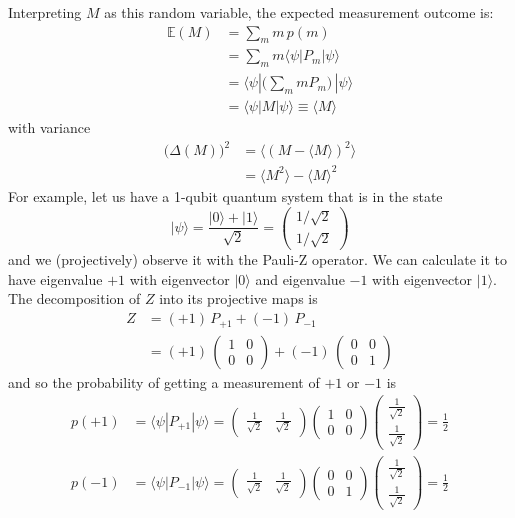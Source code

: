 \documentclass{article}
\theoremstyle{definition}
\begin{document}
Interpreting $M$ as this random variable, the expected measurement outcome is:
\begin{align*}
  \mathbb{E}(M) & = \sum_m m\, p(m) \\
  & = \sum_m m \langle \psi | P_m | \psi \rangle \\
  & = \langle \psi | \bigg( \sum_m m P_m \bigg) \, | \psi \rangle \\
  & = \langle \psi | M | \psi \rangle \equiv \langle M \rangle
\end{align*}
with variance
\begin{align*}
  \big( \Delta (M)\big)^2 & = \langle (M - \langle M \rangle )^2 \rangle \\
  & = \langle M^2 \rangle - \langle M \rangle^2
\end{align*}
For example, let us have a 1-qubit quantum system that is in the state
\[|\psi \rangle = \frac{|0\rangle + |1 \rangle}{\sqrt{2}} = \begin{pmatrix} 1/\sqrt{2} \\ 1/\sqrt{2} \end{pmatrix}\]
and we (projectively) observe it with the Pauli-Z operator. We can calculate it to have eigenvalue $+1$ with eigenvector $|0\rangle$ and eigenvalue $-1$ with eigenvector $|1\rangle$. The decomposition of $Z$ into its projective maps is
\begin{align*}
  Z & = (+1) \, P_{+1} + (-1)\, P_{-1} \\
  & = (+1) \, \begin{pmatrix} 1&0\\0&0 \end{pmatrix} + (-1)\, \begin{pmatrix} 0&0\\0&1 \end{pmatrix}
\end{align*}
and so the probability of getting a measurement of $+1$ or $-1$ is
\begin{align*}
  p(+1) & = \langle \psi | P_{+1} | \psi \rangle = \begin{pmatrix} \frac{1}{\sqrt{2}} & \frac{1}{\sqrt{2}} \end{pmatrix} \begin{pmatrix} 1&0\\0&0 \end{pmatrix} \begin{pmatrix} \frac{1}{\sqrt{2}} \\ \frac{1}{\sqrt{2}} \end{pmatrix} = \frac{1}{2} \\
  p(-1) & = \langle \psi | P_{-1} | \psi \rangle = \begin{pmatrix} \frac{1}{\sqrt{2}} & \frac{1}{\sqrt{2}} \end{pmatrix} \begin{pmatrix} 0&0\\0&1 \end{pmatrix} \begin{pmatrix} \frac{1}{\sqrt{2}} \\ \frac{1}{\sqrt{2}} \end{pmatrix} = \frac{1}{2}
\end{align*}
\end{document}
